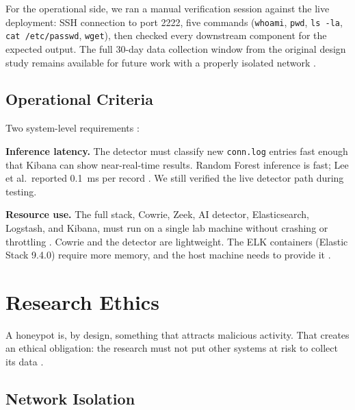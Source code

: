 For the operational side, we ran a manual verification session against the live deployment: SSH connection to port 2222, five commands (\texttt{whoami}, \texttt{pwd}, \texttt{ls -la}, \texttt{cat /etc/passwd}, \texttt{wget}), then checked every downstream component for the expected output. The full 30-day data collection window from the original design study remains available for future work with a properly isolated network \cite{lee2021classification,suareztangil2023stories,famera2025mirai,9558948}.

\subsection{Operational Criteria}
\label{subsec:operational_criteria}

Two system-level requirements \cite{rodriguezgomez2025systematic,lanz2025optimizing}:

\textbf{Inference latency.} The detector must classify new \texttt{conn.log} entries fast enough that Kibana can show near-real-time results. Random Forest inference is fast; Lee et al.\ reported 0.1~ms per record \cite{lee2021classification}. We still verified the live detector path during testing.

\textbf{Resource use.} The full stack, Cowrie, Zeek, AI detector, Elasticsearch, Logstash, and Kibana, must run on a single lab machine without crashing or throttling \cite{9359711,alzahrani2025lightweight}. Cowrie and the detector are lightweight. The ELK containers (Elastic Stack 9.4.0) require more memory, and the host machine needs to provide it \cite{franco2021survey,morozov2024sweet}.

\section{Research Ethics}
\label{sec:research_ethics}

A honeypot is, by design, something that attracts malicious activity. That creates an ethical obligation: the research must not put other systems at risk to collect its data \cite{commey2025blockchain,franco2021survey}.

\subsection{Network Isolation}
\label{subsec:network_isolation}

